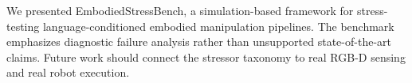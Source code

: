 We presented EmbodiedStressBench, a simulation-based framework for stress-testing language-conditioned embodied manipulation pipelines. The benchmark emphasizes diagnostic failure analysis rather than unsupported state-of-the-art claims. Future work should connect the stressor taxonomy to real RGB-D sensing and real robot execution.
